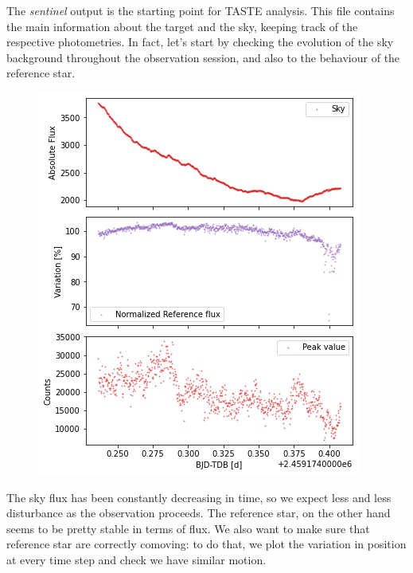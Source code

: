 \documentclass[a4paper,11pt,twocolumn]{article}
\begin{document}
\medskip

The \textit{sentinel} output is the starting point for TASTE analysis. This file 
contains the main information about the target and the sky, keeping track of the 
respective photometries. In fact, let's start by checking the evolution of the 
sky background throughout the observation session, and also to the behaviour 
of the reference star.
\begin{figure}[H]
    \centering  
    \includegraphics[scale=0.45, angle=0]{../pictures/taste/sky-ref.png}
\end{figure}
The sky flux has been constantly decreasing in time, so we expect less and less 
disturbance as the observation proceeds. The reference star, on the other hand 
seems to be pretty stable in terms of flux. 
We also want to make sure that reference star are correctly comoving: to do that, 
we plot the variation in position at every time step and check we have similar 
motion.
\end{document}
